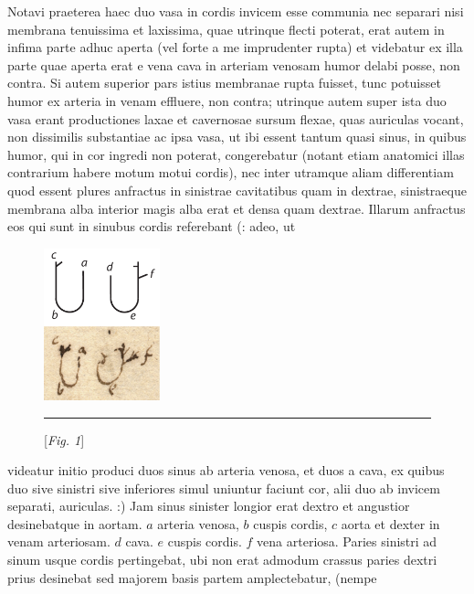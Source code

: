 Notavi praeterea haec duo vasa in cordis  invicem esse communia nec separari nisi membrana tenuissima et laxissima, quae utrinque flecti poterat, erat autem in infima parte adhuc aperta (vel forte a me imprudenter rupta) et videbatur ex illa parte quae aperta erat e vena cava in arteriam venosam humor delabi posse, non contra. Si autem superior pars istius membranae rupta fuisset, tunc potuisset humor ex arteria in venam effluere, non contra; utrinque autem super ista duo vasa erant productiones laxae et cavernosae sursum flexae, quas auriculas vocant, non dissimilis substantiae ac ipsa vasa, ut ibi essent tantum quasi sinus, in quibus humor, qui in cor ingredi non poterat, congerebatur (notant etiam anatomici illas contrarium habere motum motui cordis), nec inter utramque aliam differentiam   quod essent plures anfractus in sinistrae cavitatibus quam in dextrae, sinistraeque membrana alba interior magis alba erat et densa quam dextrae. Illarum anfractus eos qui sunt in sinubus cordis referebant (: adeo, ut 
 \begin{figure}
\vspace{-2mm}\includegraphics[trim = 0mm -3mm -5mm 0mm, clip, width=0.3\textwidth]{images/lh0040104b_003r1.pdf}\\
\rule[0cm]{14mm}{0cm}[\textit{Fig. 1}]
\end{figure}
videatur initio produci duos sinus ab arteria venosa, et duos a cava, ex quibus duo sive sinistri sive inferiores simul uniuntur faciunt cor, alii duo ab invicem separati, auriculas. :) Jam sinus sinister longior erat dextro et angustior desinebatque in aortam. $a$  arteria venosa, $b$ cuspis cordis, $c$ aorta et dexter in venam arteriosam. $d$ cava. $e$ cuspis cordis. $f$ vena arteriosa. Paries sinistri ad sinum usque cordis pertingebat, ubi non erat admodum crassus paries dextri prius desinebat sed majorem basis partem amplectebatur, (nempe
